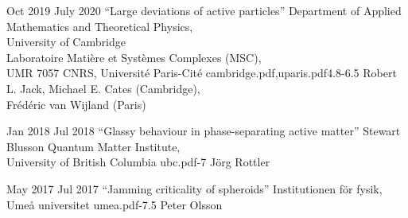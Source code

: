\documentclass[a4paper]{cvtemplate_en} %
\begin{document}
\begin{cvbody}

\cvitem
	{Oct 2019}
	{July 2020}
  {``Large deviations of active particles''}
  {Department of Applied Mathematics and Theoretical Physics,\\ University of Cambridge \\
	Laboratoire Mati\`ere et Syst\`emes Complexes (MSC),\\ UMR 7057 CNRS, Universit\'e Paris-Cit\'e }
  {cambridge.pdf,uparis.pdf}{4.8}{-6.5}
	{Robert L. Jack, Michael E. Cates (Cambridge),\\ Fr\'ed\'eric van Wijland (Paris)}
  {\\}

\cvitem
	{Jan 2018}
	{Jul 2018}
  {``Glassy behaviour in phase-separating active matter''}
  {Stewart Blusson Quantum Matter Institute,\\ University of British Columbia }
  {ubc.pdf}{}{-7}
  {J\"org Rottler}
  {\\
  }

\cvitem
	{May 2017}
	{Jul 2017}
	{``Jamming criticality of spheroids''}
	{Institutionen f\"{o}r fysik, Ume\r{a} universitet }
	{umea.pdf}{}{-7.5}
	{Peter Olsson}
	{\\
	}


\end{cvbody}
\end{document}
